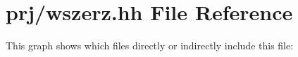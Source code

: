 \hypertarget{wszerz_8hh}{\section{prj/wszerz.hh \-File \-Reference}
\label{wszerz_8hh}
}
\-This graph shows which files directly or indirectly include this file\-:
